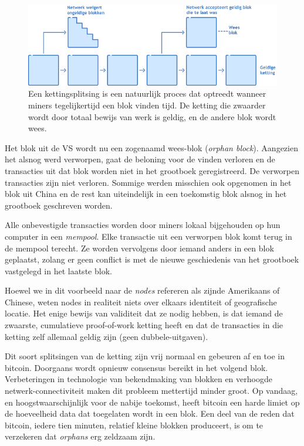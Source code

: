 \documentclass[
  letterpaper,
]{scrbook}
\begin{document}
\begin{figure}

{\centering \includegraphics{./images/fig12.png}

}

\caption{\label{fig-figuur12}Een kettingsplitsing is een natuurlijk
proces dat optreedt wanneer miners tegelijkertijd een blok vinden tijd.
De ketting die zwaarder wordt door totaal bewijs van werk is geldig, en
de andere blok wordt wees.}

\end{figure}

Het blok uit de VS wordt nu een zogenaamd wees-blok (\emph{orphan
block}). Aangezien het alsnog werd verworpen, gaat de beloning voor de
vinden verloren en de transacties uit dat blok worden niet in het
grootboek geregistreerd. De verworpen transacties zijn niet verloren.
Sommige werden misschien ook opgenomen in het blok uit China en de rest
kan uiteindelijk in een toekomstig blok alsnog in het grootboek
geschreven worden.

Alle onbevestigde transacties worden door miners lokaal bijgehouden op
hun computer in een \emph{mempool}. Elke transactie uit een verworpen
blok komt terug in de mempool terecht. Ze worden vervolgens door iemand
anders in een blok geplaatst, zolang er geen conflict is met de nieuwe
geschiedenis van het grootboek vastgelegd in het laatste blok.

Hoewel we in dit voorbeeld naar de \emph{nodes} refereren als zijnde
Amerikaans of Chinese, weten nodes in realiteit niets over elkaars
identiteit of geografische locatie. Het enige bewijs van validiteit dat
ze nodig hebben, is dat iemand de zwaarste, cumulatieve proof-of-work
ketting heeft en dat de transacties in die ketting zelf allemaal geldig
zijn (geen dubbele-uitgaven).

Dit soort splitsingen van de ketting zijn vrij normaal en gebeuren af en
toe in bitcoin. Doorgaans wordt opnieuw consensus bereikt in het volgend
blok. Verbeteringen in technologie van bekendmaking van blokken en
verhoogde netwerk-connectiviteit maken dit probleem mettertijd minder
groot. Op vandaag, en hoogstwaarschijnlijk voor de nabije toekomst,
heeft bitcoin een harde limiet op de hoeveelheid data dat toegelaten
wordt in een blok. Een deel van de reden dat bitcoin, iedere tien
minuten, relatief kleine blokken produceert, is om te verzekeren dat
\emph{orphans} erg zeldzaam zijn.
\end{document}
